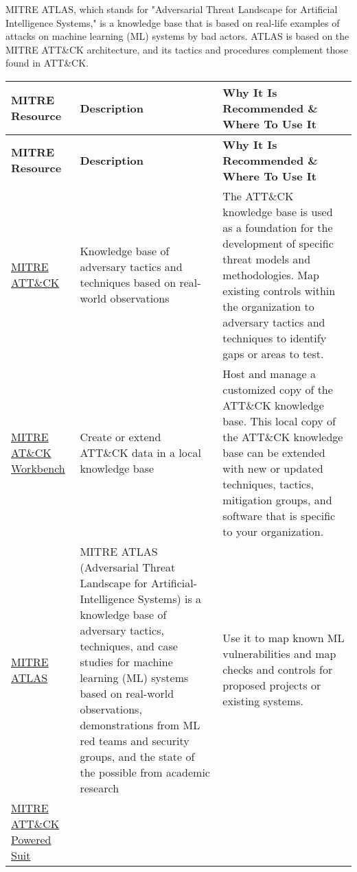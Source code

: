 MITRE ATLAS, which stands for "Adversarial Threat Landscape for Artificial
Intelligence Systems," is a knowledge base that is based on real-life examples
of attacks on machine learning (ML) systems by bad actors. ATLAS is based on the
MITRE ATT\&CK architecture, and its tactics and procedures complement those
found in ATT\&CK.
\setlength\LTleft{0pt}
\setlength\LTright{0pt}
\begin{longtable}[c]{|p{}|p{}|p{}|}
  \hline
  \rowcolor{owasplightpurple}
  \textbf{MITRE Resource} &
  \textbf{Description} &
  \textbf{Why It Is Recommended \& Where To Use It} \\
  \hline
  \endfirsthead
  \hline
  \rowcolor{owasplightpurple}
  \textbf{MITRE Resource} &
  \textbf{Description} &
  \textbf{Why It Is Recommended \& Where To Use It} \\
  \hline
  \endhead
  \endfoot
  \href{https://attack.mitre.org/}{MITRE ATT\&CK} &
  Knowledge base of adversary tactics and techniques based on real-world observations &
  The ATT\&CK knowledge base is used as a foundation for the development of
  specific threat models and methodologies. Map existing controls within the
  organization to adversary tactics and techniques to identify gaps or areas to
  test. \\
  \hline
  \href{https://medium.com/mitre-engenuity/att-ck-workbench-2-0-your-bench-your-team-your-most-relevant-ttps-5b9620457ef4}{MITRE AT\&CK Workbench} &
  Create or extend ATT\&CK data in a local knowledge base &
  Host and manage a customized copy of the ATT\&CK knowledge base. This local
  copy of the ATT\&CK knowledge base can be extended with new or updated
  techniques, tactics, mitigation groups, and software that is specific to your
  organization. \\
  \hline
  \href{https://atlas.mitre.org/}{MITRE ATLAS} &
  MITRE ATLAS (Adversarial Threat Landscape for Artificial-Intelligence Systems)
  is a knowledge base of adversary tactics, techniques, and case studies for
  machine learning (ML) systems based on real-world observations, demonstrations
  from ML red teams and security groups, and the state of the possible from
  academic research &
  Use it to map known ML vulnerabilities and map checks and controls for
  proposed projects or existing systems. \\
  \hline
  \href{https://mitre-engenuity.org/cybersecurity/center-for-threat-informed-defense/attack-powered-suit/}{MITRE ATT\&CK Powered Suit} &

\end{longtable}
